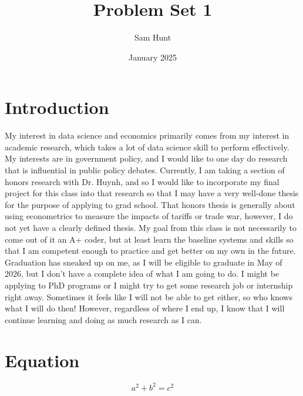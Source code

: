 \documentclass{article}
\title{Problem Set 1}
\author{Sam Hunt}
\date{January 2025}
\begin{document}
\maketitle
\section{Introduction}
My interest in data science and economics primarily comes from my interest in academic research, which takes a lot of data science skill to perform effectively. My interests are in government policy, and I would like to one day do research that is influential in public policy debates. Currently, I am taking a section of honors research with Dr. Huynh, and so I would like to incorporate my final project for this class into that research so that I may have a very well-done thesis for the purpose of applying to grad school. That honors thesis is generally about using econometrics to measure the impacts of tariffs or trade war, however, I do not yet have a clearly defined thesis. My goal from this class is not necessarily to come out of it an A+ coder, but at least learn the baseline systems and skills so that I am competent enough to practice and get better on my own in the future. Graduation has sneaked up on me, as I will be eligible to graduate in May of 2026, but I don't have a complete idea of what I am going to do. I might be applying to PhD programs or I might try to get some research job or internship right away. Sometimes it feels like I will not be able to get either, so who knows what I will do then! However, regardless of where I end up, I know that I will continue learning and doing as much research as I can.
\section{Equation}

\[a^2+b^2=c^2\]
\end{document}

